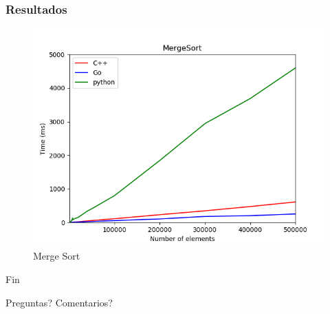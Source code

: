 \documentclass[
	11pt, %
]{beamer}
\begin{document}
\begin{frame}
	\frametitle{Resultados}
	
	\begin{figure}
		\includegraphics[width=0.8\linewidth]{mergeSort_1.png}
		\caption{Merge Sort}
	\end{figure}
\end{frame}


\begin{frame}[plain] %
	\begin{center}
		{\Huge Fin}
		
		\bigskip\bigskip %
		
		{\LARGE Preguntas? Comentarios?}
	\end{center}
\end{frame}

\end{document}

